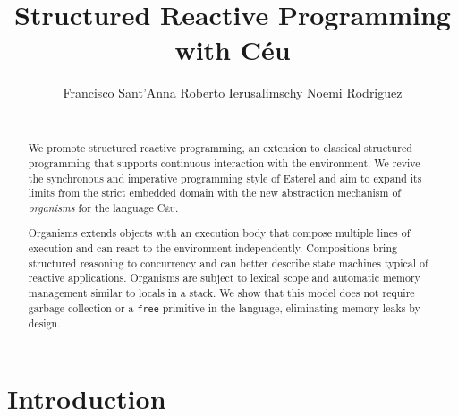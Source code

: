\documentclass{acm_proc_article-sp}
\newcommand{\CEU}{\textsc{C\'{e}u}\xspace}
\newcommand{\code}[1] {{\small{\texttt{#1}}}}
\newcommand{\1}{\;}
\newcommand{\2}{\;\;}
\newcommand{\3}{\;\;\;}
\newcommand{\5}{\;\;\;\;\;}
\begin{document}
\sloppy

\title {
    Structured Reactive Programming with C\'eu
}

\author{
    \alignauthor
    Francisco Sant'Anna \hspace{1cm} Roberto Ierusalimschy  \hspace{1cm} Noemi Rodriguez  \\
     \\
}

\maketitle

\begin{abstract}
We promote structured reactive programming, an extension to classical 
structured programming that supports continuous interaction with the 
environment.
%
We revive the synchronous and imperative programming style of Esterel and aim 
to expand its limits from the strict embedded domain with the new abstraction 
mechanism of \emph{organisms} for the language \CEU.

Organisms extends objects with an execution body that compose multiple lines of 
execution and can react to the environment independently.
%
Compositions bring structured reasoning to concurrency and can better describe 
state machines typical of reactive applications.
%
Organisms are subject to lexical scope and automatic memory management similar 
to locals in a stack.
We show that this model does not require garbage collection or a \code{free} 
primitive in the language, eliminating memory leaks by design.
\end{abstract}




\section{Introduction}
\label{sec.intro}
\end{document}
